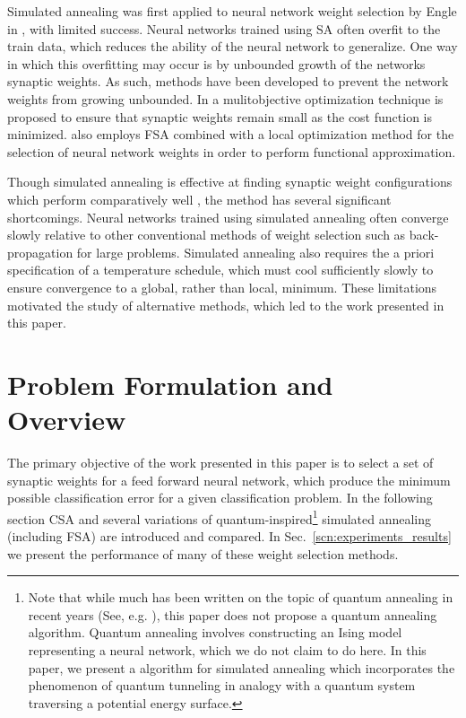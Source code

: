 \documentclass[10pt,journal,cspaper,compsoc]{IEEEtran}
\begin{document}
Simulated annealing was first applied to neural network weight selection by Engle in \cite{engel1988teachingfeedforwardnueralnetsbysa}, with limited success.  Neural networks trained using SA often overfit to the train data, which reduces the ability of the neural network to generalize. One way in which this overfitting may occur is by unbounded growth of the networks synaptic weights. As such, methods have been developed to prevent the network weights from growing unbounded. In \cite{lee2007improvinggeneralizationcapabilitynnusingsa} a mulitobjective optimization technique is proposed to ensure that synaptic weights remain small as the cost function is minimized. \cite{lee2007improvinggeneralizationcapabilitynnusingsa} also employs FSA combined with a local optimization method for the selection of neural network weights in order to perform functional approximation.

Though simulated annealing is effective at finding synaptic weight configurations which perform comparatively well \cite{lee2007improvinggeneralizationcapabilitynnusingsa, sexton1999beyondbackpropusingsa}, the method has several significant shortcomings. Neural networks trained using simulated annealing often converge slowly relative to other conventional methods of weight selection such as back-propagation for large problems. Simulated annealing also requires the a priori specification of a temperature schedule, which must cool sufficiently slowly to ensure convergence to a global, rather than local, minimum. These limitations motivated the study of alternative methods, which led to the work presented in this paper.


\section{Problem Formulation and Overview}
\label{scn:problem_formulation}

The primary objective of the work presented in this paper is to select a set of synaptic weights for a feed forward neural network, which produce the minimum possible classification error for a given classification problem. In the following section CSA and several variations of quantum-inspired\footnote{Note that while much has been written on the topic of quantum annealing in recent years (See, e.g. \cite{mukherjee2015multivariatesearchqa, roland2002quatumsearch, das2005qakcs}), this paper does not propose a quantum annealing algorithm. Quantum annealing involves constructing an Ising model representing a neural network, which we do not claim to do here. In this paper, we present a algorithm for simulated annealing which incorporates the phenomenon of quantum tunneling in analogy with a quantum system traversing a potential energy surface.}  simulated annealing (including FSA) are introduced and compared. In Sec.~\ref{scn:experiments_results} we present the performance of many of these weight selection methods.
\end{document}
